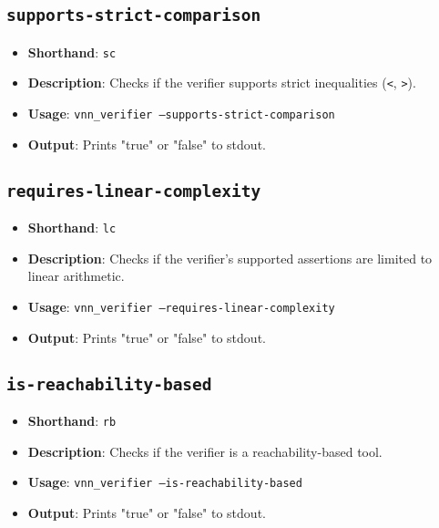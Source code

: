 \subsection{\texttt{supports-strict-comparison}}
\begin{itemize}
    \item \textbf{Shorthand}: \texttt{sc}
    \item \textbf{Description}: Checks if the verifier supports strict inequalities (\texttt{<}, \texttt{>}). 
    \item \textbf{Usage}: \texttt{vnn\_verifier --supports-strict-comparison}
    \item \textbf{Output}: Prints "true" or "false" to stdout.
\end{itemize}

\subsection{\texttt{requires-linear-complexity}}
\begin{itemize}
    \item \textbf{Shorthand}: \texttt{lc}
    \item \textbf{Description}: Checks if the verifier's supported assertions are limited to linear arithmetic. 
    \item \textbf{Usage}: \texttt{vnn\_verifier --requires-linear-complexity}
    \item \textbf{Output}: Prints "true" or "false" to stdout.
\end{itemize}

\subsection{\texttt{is-reachability-based}}
\begin{itemize}
    \item \textbf{Shorthand}: \texttt{rb}
    \item \textbf{Description}: Checks if the verifier is a reachability-based tool. 
    \item \textbf{Usage}: \texttt{vnn\_verifier --is-reachability-based}
    \item \textbf{Output}: Prints "true" or "false" to stdout.
\end{itemize}

